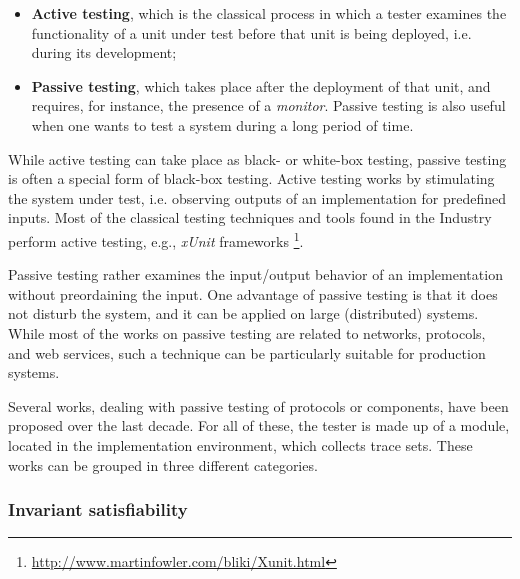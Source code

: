\begin{itemize}
    \item \textbf{Active testing}, which is the classical process
        in which a tester examines the functionality of a unit
        under test before that unit is being deployed, i.e.
        during its development;

    \item \textbf{Passive testing}, which takes place after the
        deployment of that unit, and requires, for instance, the
        presence of a \textit{monitor}. Passive testing is also
        useful when one wants to test a system during a long
        period of time.
\end{itemize}

While active testing can take place as black- or white-box
testing, passive testing is often a special form of black-box
testing. Active testing works by stimulating the system under
test, i.e. observing outputs of an implementation for predefined
inputs. Most of the classical testing techniques and tools found
in the Industry perform active testing, e.g., \textit{xUnit}
frameworks
\footnote{\url{http://www.martinfowler.com/bliki/Xunit.html}}.

Passive testing rather examines the input/output behavior of an
implementation without preordaining the input. One advantage of
passive testing is that it does not disturb the system, and it
can be applied on large (distributed) systems. While most of the
works on passive testing are related to networks, protocols, and
web services, such a technique can be particularly suitable for
production systems.

Several works, dealing with passive testing of protocols or
components, have been proposed over the last decade. For all of
these, the tester is made up of a module, located in the
implementation environment, which collects trace sets. These
works can be grouped in three different categories.

\subsubsection{Invariant satisfiability}

